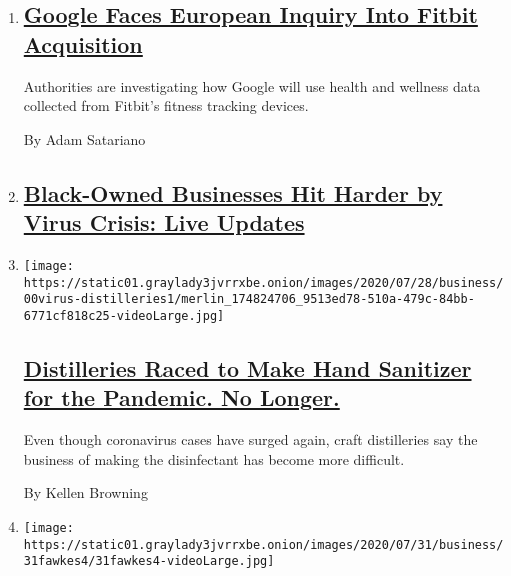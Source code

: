 \begin{enumerate}
\def\labelenumi{\arabic{enumi}.}
\item
  \hypertarget{google-faces-european-inquiry-into-fitbit-acquisition}{%
  \subsection{\texorpdfstring{\href{/2020/08/04/business/google-fitbit-europe.html}{Google
  Faces European Inquiry Into Fitbit
  Acquisition}}{Google Faces European Inquiry Into Fitbit Acquisition}}\label{google-faces-european-inquiry-into-fitbit-acquisition}}

  Authorities are investigating how Google will use health and wellness
  data collected from Fitbit's fitness tracking devices.

  By Adam Satariano
\item
  \hypertarget{black-owned-businesses-hit-harder-by-virus-crisis-live-updates}{%
  \subsection{\texorpdfstring{\href{https://www.nytimes3xbfgragh.onion/live/2020/08/04/business/stock-market-today-coronavirus}{Black-Owned
  Businesses Hit Harder by Virus Crisis: Live
  Updates}}{Black-Owned Businesses Hit Harder by Virus Crisis: Live Updates}}\label{black-owned-businesses-hit-harder-by-virus-crisis-live-updates}}
\item
  \texttt{[image: https://static01.graylady3jvrrxbe.onion/images/2020/07/28/business/00virus-distilleries1/merlin\_174824706\_9513ed78-510a-479c-84bb-6771cf818c25-videoLarge.jpg]}

  \hypertarget{distilleries-raced-to-make-hand-sanitizer-for-the-pandemic-no-longer}{%
  \subsection{\texorpdfstring{\href{/2020/08/04/business/distilleries-hand-sanitizer-pandemic.html}{Distilleries
  Raced to Make Hand Sanitizer for the Pandemic. No
  Longer.}}{Distilleries Raced to Make Hand Sanitizer for the Pandemic. No Longer.}}\label{distilleries-raced-to-make-hand-sanitizer-for-the-pandemic-no-longer}}

  Even though coronavirus cases have surged again, craft distilleries
  say the business of making the disinfectant has become more difficult.

  By Kellen Browning
\item
  \texttt{[image: https://static01.graylady3jvrrxbe.onion/images/2020/07/31/business/31fawkes4/31fawkes4-videoLarge.jpg]}


\end{enumerate}
